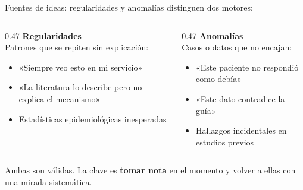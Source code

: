 \documentclass[12pt, aspectratio=169]{beamer}
\begin{document}
\begin{frame}{Fuentes de ideas: regularidades y anomalías}
  \textcite{Vandenbroucke2018_ideas} distinguen dos motores:

  \smallskip
  \begin{columns}[T]
    \begin{column}{0.47\textwidth}
      \textbf{Regularidades}\\[2pt]
      \small
      Patrones que se repiten sin explicación:\\[2pt]
      \begin{itemize}
        \item «Siempre veo esto en mi servicio»
        \item «La literatura lo describe pero no explica el mecanismo»
        \item Estadísticas epidemiológicas inesperadas
      \end{itemize}
    \end{column}
    \begin{column}{0.47\textwidth}
      \textbf{Anomalías}\\[2pt]
      \small
      Casos o datos que no encajan:\\[2pt]
      \begin{itemize}
        \item «Este paciente no respondió como debía»
        \item «Este dato contradice la guía»
        \item Hallazgos incidentales en estudios previos
      \end{itemize}
    \end{column}
  \end{columns}

  \smallskip
  \begin{keybox}
    \small
    Ambas son válidas. La clave es \textbf{tomar nota} en el momento
    y volver a ellas con una mirada sistemática.
  \end{keybox}
\end{frame}
\end{document}
